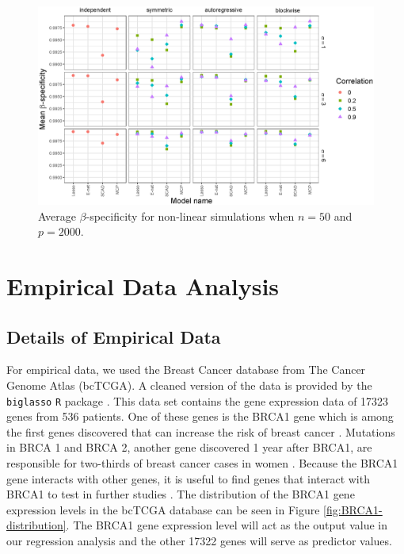 \documentclass{article}
\begin{document}
	\begin{figure}[h!]
		\centering
		\includegraphics[width = \textwidth]{images/nonlinear-facet/specificity/facet_specificity_2_50_2000.eps}
		\captionsetup{width = 0.8\textwidth}
		\caption{Average $\beta$-specificity for non-linear simulations when $n = 50$ and $p = 2000$.}
		\label{fig:nonlinear-specificity-50-2000}
	\end{figure}
	
	\section{Empirical Data Analysis}\label{sec:empirical}
	\subsection{Details of Empirical Data}
	
	For empirical data, we used the Breast Cancer database from The Cancer Genome Atlas (bcTCGA). A cleaned version of the data is provided by the \lstinline!biglasso! \lstinline!R! package \cite{zeng2017biglasso}. This data set contains the gene expression data of 17323 genes from 536 patients. One of these genes is the BRCA1 gene which is among the first genes discovered that can increase the risk of breast cancer \cite{kuchenbaecker2017risks, antoniou2003average}. Mutations in BRCA 1 and BRCA 2, another gene discovered 1 year after BRCA1, are responsible for two-thirds of breast cancer cases in women \cite{deng2000roles}. Because the BRCA1 gene interacts with other genes, it is useful to find genes that interact with BRCA1 to test in further studies \cite{deng2000roles}. The distribution of the BRCA1 gene expression levels in the bcTCGA database can be seen in Figure \ref{fig:BRCA1-distribution}. The BRCA1 gene expression level will act as the output value in our regression analysis and the other 17322 genes will serve as predictor values.
	
\end{document}
